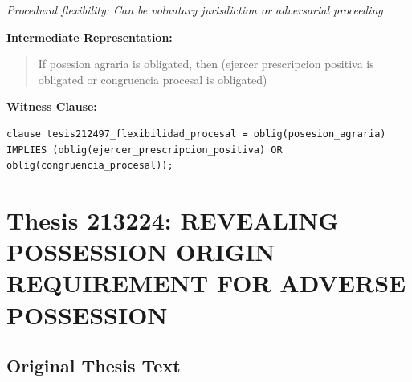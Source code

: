 \documentclass[11pt,a4paper]{article}
\begin{document}
\textit{Procedural flexibility: Can be voluntary jurisdiction or adversarial proceeding}

\textbf{Intermediate Representation:}

\begin{quote}
If posesion agraria is obligated, then (ejercer prescripcion positiva is obligated or congruencia procesal is obligated)
\end{quote}

\textbf{Witness Clause:}

\begin{lstlisting}[style=witnessstyle, language=Witness]
clause tesis212497_flexibilidad_procesal = oblig(posesion_agraria) IMPLIES (oblig(ejercer_prescripcion_positiva) OR oblig(congruencia_procesal));
\end{lstlisting}

\newpage

\section{Thesis 213224: REVEALING POSSESSION ORIGIN REQUIREMENT FOR ADVERSE POSSESSION}
\label{thesis:213224}

\subsection{Original Thesis Text}
\end{document}
